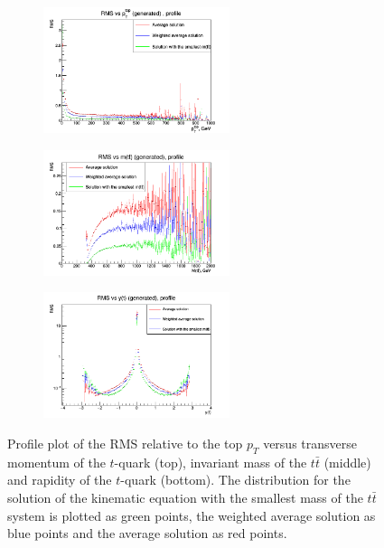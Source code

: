 \begin{figure}[h]
\centering
\begin{subfigure}
  \centering
  \includegraphics[width=0.6\textwidth]{10_appendices/min_Mtt/plots/Abs-pt.png}
\end{subfigure}
\begin{subfigure}
  \centering
  \includegraphics[width=0.6\textwidth]{10_appendices/min_Mtt/plots/Abs-mtt.png}
\end{subfigure}
\begin{subfigure}
  \centering
  \includegraphics[width=0.6\textwidth]{10_appendices/min_Mtt/plots/Abs-y.png}
\end{subfigure}
\caption{Profile plot of the RMS relative to the top $p_{T}$ versus transverse momentum of the $t$-quark (top), invariant mass of the $t\bar{t}$ (middle) and rapidity of the
$t$-quark (bottom). The distribution for the solution of the kinematic equation with the smallest mass of the $t\bar{t}$ system is plotted as green points, the weighted average solution
as blue points and the average solution as red points.}
\label{fig:Absvs}
\end{figure}